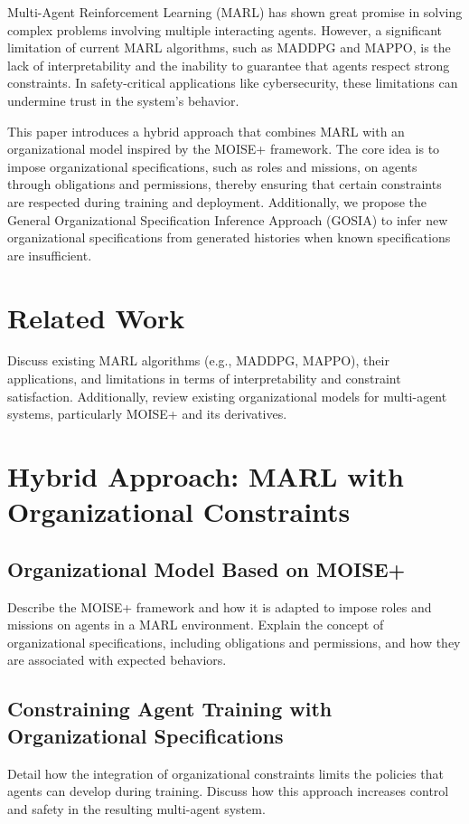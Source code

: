 \documentclass[runningheads]{llncs}
\begin{document}
Multi-Agent Reinforcement Learning (MARL) has shown great promise in solving complex problems involving multiple interacting agents. However, a significant limitation of current MARL algorithms, such as MADDPG and MAPPO, is the lack of interpretability and the inability to guarantee that agents respect strong constraints. In safety-critical applications like cybersecurity, these limitations can undermine trust in the system's behavior.

This paper introduces a hybrid approach that combines MARL with an organizational model inspired by the MOISE+ framework. The core idea is to impose organizational specifications, such as roles and missions, on agents through obligations and permissions, thereby ensuring that certain constraints are respected during training and deployment. Additionally, we propose the General Organizational Specification Inference Approach (GOSIA) to infer new organizational specifications from generated histories when known specifications are insufficient.

\section{Related Work}

Discuss existing MARL algorithms (e.g., MADDPG, MAPPO), their applications, and limitations in terms of interpretability and constraint satisfaction. Additionally, review existing organizational models for multi-agent systems, particularly MOISE+ and its derivatives.

\section{Hybrid Approach: MARL with Organizational Constraints}

\subsection{Organizational Model Based on MOISE+}
Describe the MOISE+ framework and how it is adapted to impose roles and missions on agents in a MARL environment. Explain the concept of organizational specifications, including obligations and permissions, and how they are associated with expected behaviors.

\subsection{Constraining Agent Training with Organizational Specifications}
Detail how the integration of organizational constraints limits the policies that agents can develop during training. Discuss how this approach increases control and safety in the resulting multi-agent system.
\end{document}
